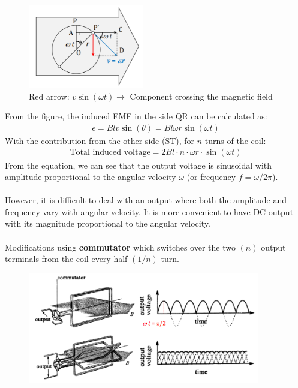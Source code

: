 \documentclass[class=report, crop=false, 12pt,a4paper]{standalone}
\begin{document}
\begin{figure}[H]
  \centering
  \includegraphics[width = 0.45\textwidth]{../img/Mdiagram47.png}
  \caption{Red arrow: $v\sin(\omega t)\longrightarrow$ Component crossing the magnetic field}
\end{figure}
From the figure, the induced EMF in the side QR can be calculated as: 
\begin{gather}
  \epsilon = Blv\sin(\theta) = Bl\omega r\sin(\omega t)
\end{gather}
With the contribution from the other side (ST), for $n$ turns of the coil:
\begin{gather}
  \text{Total induced voltage} = 2Bl\cdot n \cdot \omega r \cdot \sin(\omega t)
\end{gather}
From the equation, we can see that the output voltage is sinusoidal with amplitude proportional to the angular velocity $\omega$ (or frequency $f = \omega/2\pi$). \\\\
However, it is difficult to deal with an output where both the amplitude and frequency vary with angular velocity. It is more convenient to have DC output with its magnitude proportional to the angular velocity. \\\\
Modifications using \textbf{commutator} which switches over the two $(n)$ output terminals from the coil every half $(1/n)$ turn.
\begin{figure}[H]
  \centering
  \includegraphics[width = 0.9\textwidth]{../img/Mdiagram48.png}
\end{figure}
\end{document}
